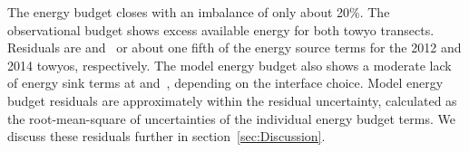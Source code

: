 \documentclass{ametsocV6.1}
\begin{document}
The energy budget closes with an imbalance of only about 20\%.
The observational budget shows excess available energy for both towyo transects.
Residuals are \TyAResidual{} and \TyBResidual\,\TyBResidualUnit{} or about one fifth of the energy source terms for the 2012 and 2014 towyos, respectively.
The model energy budget also shows a moderate lack of energy sink terms at \ModelUpperResidual{} and \ModelLowerResidual\,\ModelLowerResidualUnit, depending on the interface choice.
Model energy budget residuals are approximately within the residual uncertainty, calculated as the root-mean-square of uncertainties of the individual energy budget terms.
We discuss these residuals further in section~\ref{sec:Discussion}.

\end{document}
